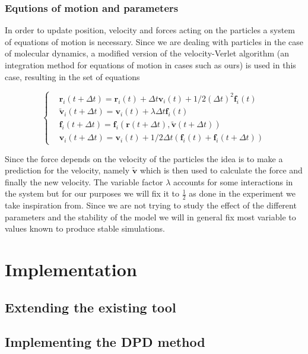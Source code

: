 \documentclass[]{usiinfbachelorproject}
\begin{document}
\subsubsection{Equtions of motion and parameters}
In order to update position, velocity and forces acting on the particles a system of equations of motion is 
necessary. Since we are dealing with particles in the case of molecular dynamics, a modified version of the 
velocity-Verlet algorithm (an integration method for equations of motion in cases such as ours) is used in this case, 
resulting in the set of equations 

\begin{equation}
    \left\{
        \begin{aligned}
          & \textbf{r}_i (t + \Delta t) = \textbf{r}_i (t) + \Delta t \textbf{v}_i (t) + 1/2(\Delta t)^2 \textbf{f}_i(t)\\
          & \tilde{\textbf{v}}_i (t + \Delta t) = \textbf{v}_i (t) + \lambda  \Delta t \textbf{f}_i(t)\\
          & \textbf{f}_i(t + \Delta t) = \textbf{f}_i(\textbf{r} (t + \Delta t), \tilde{\textbf{v}} (t + \Delta t))\\
          & \textbf{v}_i (t + \Delta t) = \textbf{v}_i (t) + 1/2 \Delta t (\textbf{f}_i(t) + \textbf{f}_i(t + \Delta t))
        \end{aligned}
      \right.
\end{equation}

Since the force depends on the velocity of the particles the idea is to make a prediction for the velocity, namely 
$\tilde{\textbf{v}}$ which is then used to calculate the force and finally the new velocity. The variable factor 
$\lambda$ accounts for some interactions in the system but for our purposes we will fix it to $\frac{1}{2}$ as 
done in the experiment we take inspiration from. Since we are not trying to study the 
effect of the different parameters and the stability of the model we will in general fix most 
variable to values known to produce stable simulations.
\newpage
\section{Implementation}
\subsection{Extending the existing tool}
\subsection{Implementing the DPD method}
\end{document}
